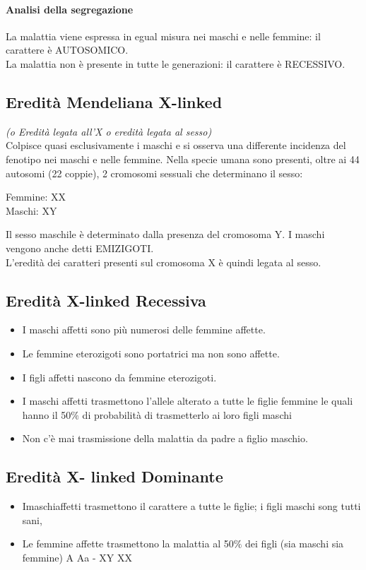 \documentclass{article}
\begin{document}
\paragraph{Analisi della segregazione}
La malattia viene espressa in egual misura nei maschi e nelle femmine: il carattere è AUTOSOMICO.\\
La malattia non è presente in tutte le generazioni: il carattere è RECESSIVO.
\subsection{Eredità Mendeliana X-linked} \textit{(o Eredità legata all'X o eredità legata al sesso)}\\
Colpisce quasi esclusivamente i maschi e si osserva una differente incidenza del fenotipo nei maschi e nelle femmine.
Nella specie umana sono presenti, oltre ai 44 autosomi (22 coppie), 2 cromosomi sessuali che determinano il sesso:
\begin{center}
Femmine: XX\\
Maschi: XY
\end{center}
Il sesso maschile è determinato dalla presenza del cromosoma Y. I maschi vengono anche detti EMIZIGOTI.\\
L'eredità dei caratteri presenti sul cromosoma X è quindi legata al sesso.
\subsection{Eredità X-linked Recessiva}
\begin{itemize}
    \item I maschi affetti sono più numerosi delle femmine affette.
    \item Le femmine eterozigoti sono portatrici ma non sono affette.
    \item I figli affetti nascono da femmine eterozigoti.
    \item I maschi affetti trasmettono l'allele alterato a tutte le figlie femmine le quali hanno il 50$\%$ di probabilità di trasmetterlo ai loro figli maschi
    \item Non c'è mai trasmissione della malattia da padre a figlio maschio.
\end{itemize}
\subsection{Eredità X- linked Dominante}
\begin{itemize}
    \item Imaschiaffetti trasmettono il carattere a tutte le figlie; i figli maschi song tutti sani,
    \item Le femmine affette trasmettono la malattia al 50$\%$ dei figli (sia maschi sia femmine) A Aa - XY XX
\end{itemize}
\end{document}
